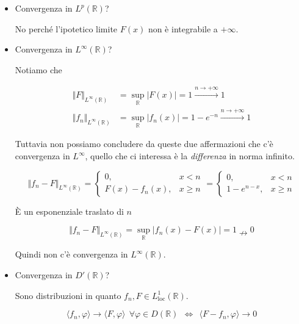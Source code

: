 \begin{itemize}
\item Convergenza in $L^{p}(\mathbb{R})$?

No perché l'ipotetico limite $F( x)$ non è integrabile a $+\infty $.
\item Convergenza in $L^{\infty }(\mathbb{R})$?

Notiamo che

\begin{equation*}
\begin{aligned}
\Vert F\Vert _{L^{\infty }(\mathbb{R})} & =\sup _{\mathbb{R}}| F( x)| =1\xrightarrow{n\rightarrow +\infty } 1\\
\Vert f_{n}\Vert _{L^{\infty }(\mathbb{R})} & =\sup _{\mathbb{R}}| f_{n}( x)| =1-e^{-n}\xrightarrow{n\rightarrow +\infty } 1
\end{aligned}
\end{equation*}

Tuttavia non possiamo concludere da queste due affermazioni che c'è convergenza in $L^{\infty }$, quello che ci interessa è la \textit{differenza} in norma infinito.

\begin{equation*}
\Vert f_{n} -F\Vert _{L^{\infty }(\mathbb{R})} =\begin{cases}
0, & x< n\\
F( x) -f_{n}( x) , & x\geqslant n
\end{cases} =\begin{cases}
0, & x< n\\
1-e^{n-x} , & x\geqslant n
\end{cases}
\end{equation*}

È un esponenziale traslato di $n$

\begin{equation*}
\Vert f_{n} -F\Vert _{L^{\infty }(\mathbb{R})} =\sup _{\mathbb{R}}| f_{n}( x) -F( x)| =1\nrightarrow 0
\end{equation*}

Quindi non c'è convergenza in $L^{\infty }(\mathbb{R})$.
\item Convergenza in $D'(\mathbb{R})$?

Sono distribuzioni in quanto $f_{n} ,F\in L^{1}_{\mathrm{loc}}(\mathbb{R})$.

\begin{equation*}
\langle f_{n} ,\varphi \rangle \rightarrow \langle F,\varphi \rangle \ \ \forall \varphi \in D(\mathbb{R}) \ \ \iff \ \ \langle F-f_{n} ,\varphi \rangle \rightarrow 0
\end{equation*}


\end{itemize}

